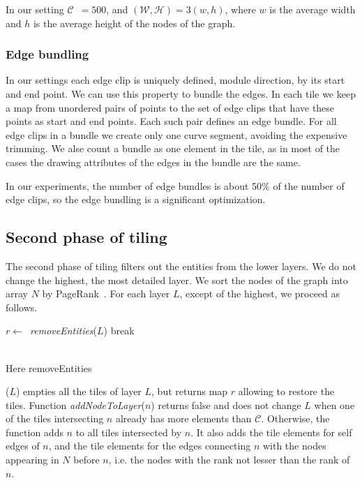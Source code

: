 \documentclass{gd-llncs}
\newcommand{\capac}{$\mathcal{C}$}
\begin{document}
{In our setting \capac~$=500$, and $(\mathcal{W},\mathcal{H}) = 3(w,h)$, where $w$ is the average width and $h$ is the average height of the nodes of the graph.
\subsubsection*{Edge bundling}
In our settings each edge clip is uniquely defined, module direction, by its start and end point. We can use this property to bundle the edges. In each tile we keep a map from unordered pairs of points to the set of edge clips that have these points as start and end points. Each such pair defines an edge bundle. For all edge clips in a bundle we create only one curve segment, avoiding the expensive trimming. We alse count a bundle as one element in the tile, as in most of the cases the drawing attributes of the edges in the bundle are the same.

In our experiments, the number of edge bundles is about 50\% of the number of edge clips, so the edge bundling is a significant optimization.

\subsection*{Second phase of tiling}
The second phase of tiling filters out the entities from the lower layers. We do not change the highest, the most detailed layer.
We sort the nodes of the graph into array $N$ by PageRank~\cite{page1999pagerank}. For each layer $L$, except of the highest, we proceed as follows.
\begin{algorithm}
  \begin{algorithmic}[1]
    \State $r \gets$~\textit{removeEntities}($L$)
    {break}
    \EndIf
    \EndFor
    \EndProcedure
  \end{algorithmic}
\end{algorithm}\\
Here removeEntities}($L$) empties all the tiles of layer $L$, but returns map $r$ allowing to restore the tiles. Function \textit{addNodeToLayer}($n$) returns false and does not change $L$ when one of the tiles intersecting $n$ already has more elements than \capac. Otherwise, the function adds $n$ to all tiles intersected by $n$. It also adds the tile elements for self edges of $n$, and the tile elements for the edges connecting $n$ with the nodes appearing in $N$ before $n$, i.e. the nodes with the rank not lesser than the rank of $n$.
\end{document}
